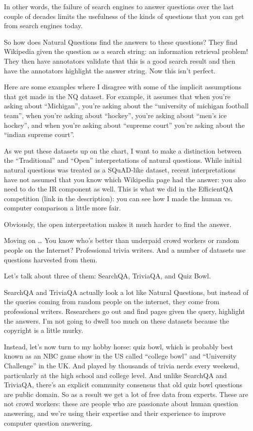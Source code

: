 In other words, the failure of search engines to answer questions over the last couple of decades limits the usefulness of the kinds of questions that you can get from search engines today.  

So how does Natural Questions find the answers to these questions?  They find Wikipedia given the question as a search string: an information retrieval problem!  They then have annotators validate that this is a good search result and then have the annotators highlight the answer string.  Now this isn’t perfect.  

Here are some examples where I disagree with some of the implicit assumptions that get made in the NQ dataset.  For example, it assumes that when you’re asking about “Michigan”, you’re asking about the “university of michigan football team”, when you’re asking about “hockey”, you’re asking about “men’s ice hockey”, and when you’re asking about “supreme court” you’re asking about the “indian supreme court”.  

As we put these datasets up on the chart, I want to make a distinction between the “Traditional” and “Open” interpretations of natural questions.  While initial natural questions was treated as a SQuAD-like dataset, recent interpretations have not assumed that you know which Wikipedia page had the answer: you also need to do the IR component as well.  This is what we did in the EfficientQA competition (link in the description): you can see how I made the human vs. computer comparison a little more fair.

Obviously, the open interpretation makes it much harder to find the answer.


Moving on … You know who’s better than underpaid crowd workers or random people on the Internet?  Professional trivia writers.  And a number of datasets use questions harvested from them.

Let’s talk about three of them: SearchQA, TriviaQA, and Quiz Bowl.

SearchQA and TriviaQA actually look a lot like Natural Questions, but instead of the queries coming from random people on the internet, they come from professional writers.  Researchers go out and find pages given the query, highlight the answers.  I’m not going to dwell too much on these datasets because the copyright is a little murky.

Instead, let's now turn to my hobby horse: quiz bowl, which is probably best known as an NBC game show in the US called “college bowl” and “University Challenge” in the UK.  And played by thousands of trivia nerds every weekend, particularly at the high school and college level.  And unlike SearchQA and TriviaQA, there’s an explicit community consensus that old quiz bowl questions are public domain.  So as a result we get a lot of free data from experts. These are not crowd workers: these are people who are passionate about human question answering, and we're using their expertise and their experience to improve computer question answering.

